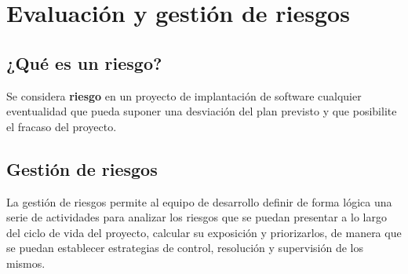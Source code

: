 
\section{Evaluación y gestión de riesgos}
\subsection{¿Qué es un riesgo?}
Se considera \textbf{riesgo} en un proyecto de implantación de software cualquier 
eventualidad que pueda suponer una desviación del plan previsto y que posibilite el 
fracaso del proyecto. 

\subsection{Gestión de riesgos}
La gestión de riesgos permite al equipo de desarrollo definir de forma lógica una serie 
de actividades para analizar los riesgos que se puedan presentar a lo largo del ciclo
de vida del proyecto, calcular su exposición y priorizarlos, de manera que se puedan 
establecer estrategias de control, resolución y supervisión de los mismos.

